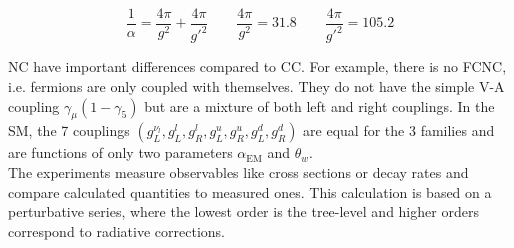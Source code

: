 \documentclass[10.75pt,a4paper,openright,bottom=2cm]{article}
\newcommand{\beginbox}[1]{\begin{tcolorbox}[width=\textwidth,colback={yellow!50},title={#1},colbacktitle={gray!50},coltitle=black]}
\renewcommand{\endbox}{\end{tcolorbox}\noindent}
\begin{document}
\beginbox{Coupling Constants}
\[
\frac{1}{\alpha}=\frac{4\pi}{g^2}+\frac{4\pi}{g'^2} \qquad \frac{4\pi}{g^2}=31.8 \qquad \frac{4\pi}{g'^2}=105.2
\]
\endbox
NC have important differences compared to CC. For example, there is no FCNC, i.e. fermions are only coupled with themselves. They do not have the simple V-A coupling $\gamma_\mu(1-\gamma_5)$ but are a mixture of both left and right couplings. In the SM, the 7 couplings $(g_L^{\nu_l}, g_L^l, g_R^l, g_L^u, g_R^u, g_L^d, g_R^d)$ are equal for the 3 families and are functions of only two parameters $\alpha_{\text{EM}}$ and $\theta_w$.\\
The experiments measure observables like cross sections or decay rates and compare calculated quantities to measured ones. This calculation is based on a perturbative series, where the lowest order is the tree-level and higher orders correspond to radiative corrections. 
\end{document}
